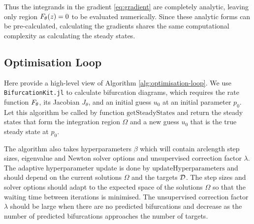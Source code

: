 Thus the integrands in the gradient \eqref{eq:gradient} are completely analytic, leaving only region $F_{\theta}(z)=0$ to be evaluated numerically. Since these analytic forms can be pre-calculated, calculating the gradients shares the same computational complexity as calculating the steady states. 

\subsection{Optimisation Loop}
Here provide a high-level view of Algorithm \ref{alg:optimisation-loop}. We use \texttt{BifurcationKit.jl} \cite{Veltz2019PseudoArcLengthContinuation.jl} to calculate bifurcation diagrams, which requires the rate function $F_{\theta}$, its Jacobian $J_\theta$, and an initial guess $u_0$ at an initial parameter $p_0$. Let this algorithm be called by function $\mathrm{getSteadyStates}$ and return the steady states that form the integration region $\Omega$ and a new guess $u_0$ that is the true steady state at $p_0$.

The algorithm also takes hyperparameters $\beta$ which will contain arclength step sizes, eigenvalue and Newton solver options and unsupervised correction factor $\lambda$. The adaptive hyperparameter update is done by $\mathrm{updateHyperparameters}$ and should depend on the current solutions $\Omega$ and the targets $\mathcal{D}$. The step sizes and solver options should adapt to the expected space of the solutions $\Omega$ so that the waiting time between iterations is minimised. The unsupervised correction factor $\lambda$ should be large when there are no predicted bifurcations and decrease as the number of predicted bifurcations approaches the number of targets.

